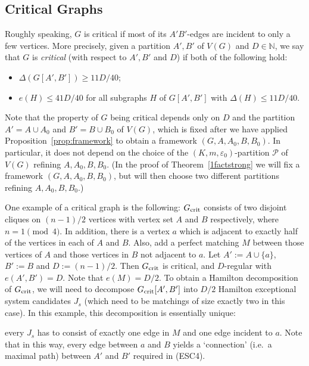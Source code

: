 \documentclass{memo-l}
\def\COMMENT#1{}
\def\eps{\varepsilon}
\def\epszero{\eps_0}
\numberwithin{section}{chapter}
\numberwithin{equation}{section}
\numberwithin{firstthm}{section}
\numberwithin{figure}{section}
\begin{document}
\subsection{Critical Graphs}


Roughly speaking, $G$ is critical if most of its $A'B'$-edges are incident to only a few vertices. More precisely, given a partition $A',B'$ of $V(G)$ and $D \in \mathbb N$, we say that
$G$ is \emph{critical} (with respect to $A',B'$ and $D$) if both of the following hold:
\begin{itemize}
\item $\Delta(G[A',B']) \ge 11 D/40$;
\item  $e(H) \le 41 D/40$ for all subgraphs $H$ of $G[A',B']$ with $\Delta(H) \le 11 D/40$.%
     \COMMENT{Note that there is no assumption on $e_G(A',B')$.}
\end{itemize}
Note that the property of $G$ being critical depends only on $D$ and the partition $A'=A\cup A_0$ and $B'=B\cup B_0$ of $V(G)$, which is
fixed after we have applied Proposition~\ref{prop:framework} to obtain a framework $(G,A,A_0,B,B_0)$.
In particular, it does not depend on the choice of the $(K,m, \epszero)$-partition $\mathcal{P}$ of $V(G)$ refining $A,A_0,B,B_0$.
(In the proof of Theorem~\ref{1factstrong} we will fix a framework $(G,A,A_0,B,B_0)$, but will then choose two different
partitions refining $A,A_0,B,B_0$.)%
     \COMMENT{i.e. $G$ will not change from being critical to not.}

One example of a critical graph is the following:
$G_{\rm crit}$ consists of two disjoint cliques on $(n-1)/2$ vertices with vertex set $A$ and $B$ respectively, where $n = 1 \pmod{4}$.
In addition, there is a vertex $a$ which is adjacent to exactly half of the vertices in each of $A$ and $B$.
Also, add a perfect matching $M$ between those vertices of $A$ and those vertices in $B$ not adjacent to $a$.
Let  $A':=A \cup \{a\}$, $B':=B$ and $D:=(n-1)/2$.
Then $G_{\rm crit}$ is critical, and $D$-regular with $e(A',B')=D$. Note that $e(M)=D/2$.
%
To obtain a Hamilton decomposition of $G_{\rm crit}$, 
we will need to decompose $G_{\rm crit}[A',B']$ into $D/2$ Hamilton exceptional system candidates $J_s$
(which need to be matchings of size exactly two in this case).
In this example, this decomposition is essentially unique:%
   \COMMENT{Daniela: added essentially}
every $J_s$ has to consist of exactly one edge in $M$ and one edge incident to $a$.
Note that in this way, every edge between $a$ and $B$ yields a `connection'  (i.e.~a maximal path) between $A'$ and $B'$ required in (ESC4).
\end{document}
